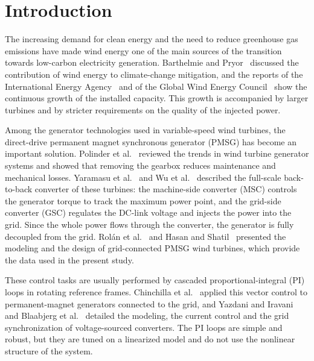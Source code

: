 \documentclass[11pt,a4paper]{article}
\begin{document}
\section{Introduction}
The increasing demand for clean energy and the need to reduce greenhouse gas emissions have made wind
energy one of the main sources of the transition towards low-carbon electricity generation.
Barthelmie and Pryor~\cite{barthelmie2021} discussed the contribution of wind energy to climate-change
mitigation, and the reports of the International Energy Agency~\cite{iea2024} and of the Global Wind
Energy Council~\cite{gwec2024} show the continuous growth of the installed capacity. This growth is
accompanied by larger turbines and by stricter requirements on the quality of the injected power.

Among the generator technologies used in variable-speed wind turbines, the direct-drive permanent
magnet synchronous generator (PMSG) has become an important solution. Polinder et al.~\cite{polinder2013}
reviewed the trends in wind turbine generator systems and showed that removing the gearbox reduces
maintenance and mechanical losses. Yaramasu et al.~\cite{yaramasu2015} and Wu et al.~\cite{wu2011}
described the full-scale back-to-back converter of these turbines: the machine-side converter (MSC)
controls the generator torque to track the maximum power point, and the grid-side converter (GSC)
regulates the DC-link voltage and injects the power into the grid. Since the whole power flows through
the converter, the generator is fully decoupled from the grid. Rol\'an et al.~\cite{rolan2009} and
Hasan and Shatil~\cite{hasan2021} presented the modeling and the design of grid-connected PMSG wind
turbines, which provide the data used in the present study.

These control tasks are usually performed by cascaded proportional-integral (PI) loops in rotating
reference frames. Chinchilla et al.~\cite{chinchilla2006} applied this vector control to permanent-magnet
generators connected to the grid, and Yazdani and Iravani~\cite{yazdani2010} and Blaabjerg et
al.~\cite{blaabjerg2006} detailed the modeling, the current control and the grid synchronization of
voltage-sourced converters. The PI loops are simple and robust, but they are tuned on a linearized model
and do not use the nonlinear structure of the system.
\end{document}

